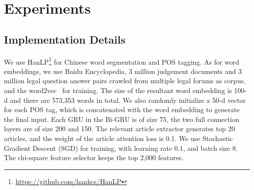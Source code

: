 \section{Experiments}
\subsection{Implementation Details}
We use HanLP\footnote{\url{https://github.com/hankcs/HanLP}} for Chinese word segmentation and POS tagging. 
As for word embeddings, we use Baidu Encyclopedia, 3 million judgement documents and 3 million legal question answer pairs crawled from multiple legal forums as corpus, and the word2vec~\cite{mikolov2013distributed} for training. 
The size of the resultant word embedding is 100-d and there are 573,353 words in total. 
We also randomly initialize a 50-d vector for each POS tag, which is concatenated with the word embedding to generate the final input.
Each GRU in the Bi-GRU is of size 75, the two full connection layers are of size 200 and 150.
The relevant article extractor generates top 20 articles, and the weight of the article attention loss is 0.1. 
We use Stochastic Gradient Descent (SGD) for training, with learning rate 0.1, and batch size 8.
The chi-square feature selector keeps the top 2,000 features.


